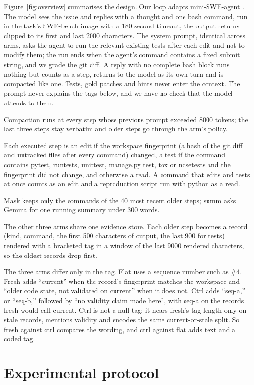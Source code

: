 \documentclass[11pt,a4paper]{article}
\begin{document}
Figure~\ref{fig:overview} summarises the design. Our loop adapts mini-SWE-agent \citep{yang2024}. The model sees the issue and replies with a thought and one bash command, run in the task's SWE-bench image with a 180 second timeout; the output returns clipped to its first and last 2000 characters. The system prompt, identical across arms, asks the agent to run the relevant existing tests after each edit and not to modify them; the run ends when the agent's command contains a fixed submit string, and we grade the git diff. A reply with no complete bash block runs nothing but counts as a step, returns to the model as its own turn and is compacted like one. Tests, gold patches and hints never enter the context. The prompt never explains the tags below, and we have no check that the model attends to them.

Compaction runs at every step whose previous prompt exceeded 8000 tokens; the last three steps stay verbatim and older steps go through the arm's policy.

Each executed step is an edit if the workspace fingerprint (a hash of the git diff and untracked files after every command) changed, a test if the command contains pytest, runtests, unittest, manage.py test, tox or nosetests and the fingerprint did not change, and otherwise a read. A command that edits and tests at once counts as an edit and a reproduction script run with python as a read.

Mask keeps only the commands of the 40 most recent older steps; summ asks Gemma for one running summary under 300 words.

The other three arms share one evidence store. Each older step becomes a record (kind, command, the first 500 characters of output, the last 900 for tests) rendered with a bracketed tag in a window of the last 9000 rendered characters, so the oldest records drop first.

The three arms differ only in the tag. Flat uses a sequence number such as \#4. Fresh adds ``current'' when the record's fingerprint matches the workspace and ``older code state, not validated on current'' when it does not. Ctrl adds ``seq-a,'' or ``seq-b,'' followed by ``no validity claim made here'', with seq-a on the records fresh would call current. Ctrl is not a null tag: it nears fresh's tag length only on stale records, mentions validity and encodes the same current-or-stale split. So fresh against ctrl compares the wording, and ctrl against flat adds text and a coded tag.

\section{Experimental protocol}
\end{document}

